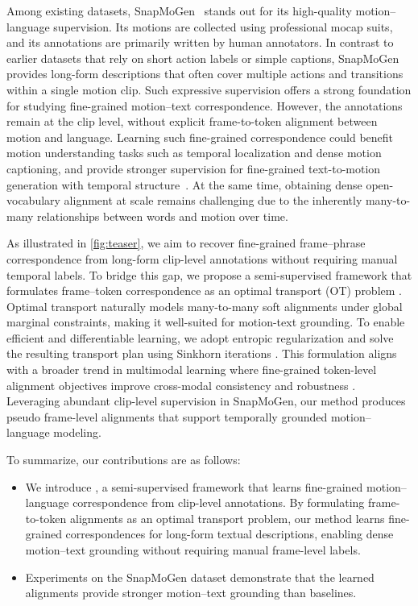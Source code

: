 Among existing datasets, SnapMoGen~\cite{guo2025snapmogen} stands out for its high-quality motion–language supervision. Its motions are collected using professional mocap suits, and its annotations are primarily written by human annotators. In contrast to earlier datasets that rely on short action labels or simple captions, SnapMoGen provides long-form descriptions that often cover multiple actions and transitions within a single motion clip. Such expressive supervision offers a strong foundation for studying fine-grained motion–text correspondence. However, the annotations remain at the clip level, without explicit frame-to-token alignment between motion and language. Learning such fine-grained correspondence could benefit motion understanding tasks such as temporal localization and dense motion captioning, and provide stronger supervision for fine-grained text-to-motion generation with temporal structure~\cite{wu2025mg,xudense,zhang2023finemogen}. At the same time, obtaining dense open-vocabulary alignment at scale remains challenging due to the inherently many-to-many relationships between words and motion over time.

As illustrated in \cref{fig:teaser}, we aim to recover fine-grained frame--phrase correspondence from long-form clip-level annotations without requiring manual temporal labels. To bridge this gap, we propose a semi-supervised framework that formulates frame--token correspondence as an optimal transport (OT) problem \cite{cuturi2013sinkhorn,peyre2019computational}.
Optimal transport naturally models many-to-many soft alignments under global marginal constraints, making it well-suited for motion-text grounding. To enable efficient and differentiable learning, we adopt entropic regularization and solve the resulting transport plan using Sinkhorn iterations \cite{cuturi2013sinkhorn}.
This formulation aligns with a broader trend in multimodal learning where fine-grained token-level alignment objectives improve cross-modal consistency and robustness \cite{yao2021filip,zhang2025pre,linmulti}.
Leveraging abundant clip-level supervision in SnapMoGen, our method produces pseudo frame-level alignments that support temporally grounded motion--language modeling.

To summarize, our contributions are as follows:
\begin{itemize}
\item We introduce \ours, a semi-supervised framework that learns fine-grained motion--language correspondence from clip-level annotations. By formulating frame-to-token alignments as an optimal transport problem, our method learns fine-grained correspondences for long-form textual descriptions, enabling dense motion--text grounding without requiring manual frame-level labels.
\item Experiments on the SnapMoGen dataset demonstrate that the learned alignments provide stronger motion--text grounding than baselines.
\end{itemize}

